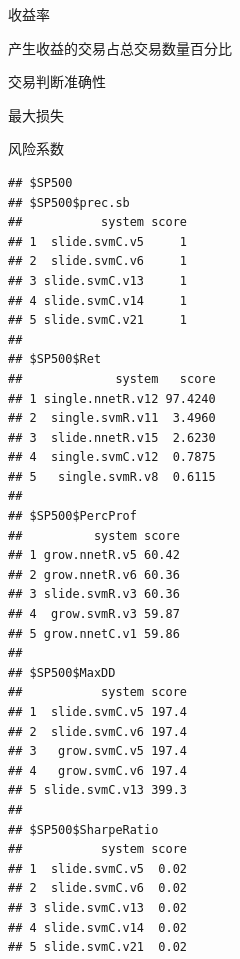 \documentclass{article}\usepackage[]{graphicx}\usepackage[]{color}
\makeatletter
\newenvironment{kframe}{%
 \def\at@end@of@kframe{}%
 \ifinner\ifhmode%
  \def\at@end@of@kframe{\end{minipage}}%
  \begin{minipage}{\columnwidth}%
 \fi\fi%
 \def\FrameCommand##1{\hskip\@totalleftmargin \hskip-\fboxsep
 \colorbox{shadecolor}{##1}\hskip-\fboxsep
     \hskip-\linewidth \hskip-\@totalleftmargin \hskip\columnwidth}%
 \MakeFramed {\advance\hsize-\width
   \@totalleftmargin\z@ \linewidth\hsize
   \@setminipage}}%
 {\par\unskip\endMakeFramed%
 \at@end@of@kframe}
\newenvironment{knitrout}{}{} %
\makeatother
\begin{document}
\begin{CJK*}{UTF8}{gkai}
\textbullet 收益率

\textbullet 产生收益的交易占总交易数量百分比

\textbullet 交易判断准确性

\textbullet 最大损失

\textbullet 风险系数

\begin{knitrout}
\color{fgcolor}\begin{kframe}
\begin{verbatim}
## $SP500
## $SP500$prec.sb
##           system score
## 1  slide.svmC.v5     1
## 2  slide.svmC.v6     1
## 3 slide.svmC.v13     1
## 4 slide.svmC.v14     1
## 5 slide.svmC.v21     1
## 
## $SP500$Ret
##             system   score
## 1 single.nnetR.v12 97.4240
## 2  single.svmR.v11  3.4960
## 3  slide.nnetR.v15  2.6230
## 4  single.svmC.v12  0.7875
## 5   single.svmR.v8  0.6115
## 
## $SP500$PercProf
##          system score
## 1 grow.nnetR.v5 60.42
## 2 grow.nnetR.v6 60.36
## 3 slide.svmR.v3 60.36
## 4  grow.svmR.v3 59.87
## 5 grow.nnetC.v1 59.86
## 
## $SP500$MaxDD
##           system score
## 1  slide.svmC.v5 197.4
## 2  slide.svmC.v6 197.4
## 3   grow.svmC.v5 197.4
## 4   grow.svmC.v6 197.4
## 5 slide.svmC.v13 399.3
## 
## $SP500$SharpeRatio
##           system score
## 1  slide.svmC.v5  0.02
## 2  slide.svmC.v6  0.02
## 3 slide.svmC.v13  0.02
## 4 slide.svmC.v14  0.02
## 5 slide.svmC.v21  0.02
\end{verbatim}
\end{kframe}
\end{knitrout}


\end{CJK*}
\end{document}
